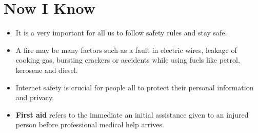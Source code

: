 \section{Now I Know}
\begin{itemize}
    \item It is a very important for all us to follow safety rules and stay safe.
    \item A fire may be many factors such as a fault in electric wires, leakage of cooking gas, bursting crackers or accidents while using fuels like petrol, kerosene and diesel.
    \item Internet safety is crucial for people all to protect their personal information and privacy.
    \item \textbf{First aid} refers to the immediate an initial assistance given to an injured person before professional medical help arrives.
\end{itemize}